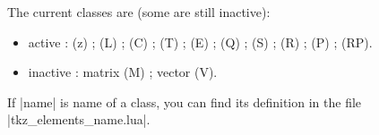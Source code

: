 The current classes are (some are still inactive):
\begin{itemize}
   \item active :  (z) ;   (L) ;  (C) ;  (T) ;  (E) ;  (Q) ;  (S) ;  (R) ;  (P) ;  (RP).
   
   \item  inactive : matrix (M) ; vector (V).

\end{itemize}

If |name| is name of a class, you can find its definition in the file |tkz_elements_name.lua|.

     


